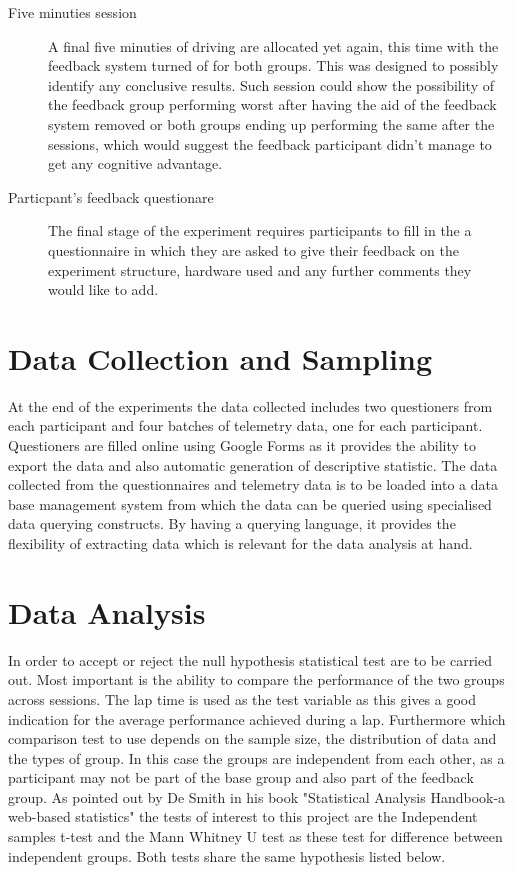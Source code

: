 \begin{description}
	\item[Five minuties session] A final five minuties of driving are allocated yet again, this time with the feedback system turned of for both groups. This was designed to possibly identify any conclusive results. Such session could show the possibility of the feedback group performing worst after having the aid of the feedback system removed or both groups ending up performing the same after the sessions, which would suggest the feedback participant didn't manage to get any cognitive advantage.
	
	\item[Particpant's feedback questionare] The final stage of the experiment requires participants to fill in the a questionnaire  in which they are asked to give their feedback on the experiment structure, hardware used and any further comments they would like to add.
	
\end{description}

\section{Data Collection and Sampling}
\label{sec:meth-data-gathering}
At the end of the experiments the data collected includes two questioners from each participant and four batches of telemetry data, one for each participant. Questioners are filled online using Google Forms as it provides the ability to export the data and also automatic generation of descriptive statistic. The data collected from the questionnaires and telemetry data is to be loaded into a data base management system from which the data can be queried using specialised data querying constructs. By having a querying language, it provides the flexibility of extracting data which is relevant for the data analysis at hand.

\section{Data Analysis}
\label{sec:meth-data-analysis}
In order to accept or reject the null hypothesis statistical test are to be carried out. Most important is the ability to compare the performance of the two groups across sessions. The lap time is used as the test variable as this gives a good indication for the average performance achieved during a lap. Furthermore which comparison test to use depends on the sample size, the distribution of data and the types of group. In this case the groups are independent from each other, as a participant may not be part of the base group and also part of the feedback group. As pointed out by De Smith in his book "Statistical Analysis Handbook-a web-based statistics" the tests of interest to this project are the Independent samples t-test\cite{de2015statsref} and the Mann Whitney U test\cite{de2015statsref} as these test for difference between independent groups. Both tests share the same hypothesis listed below.

